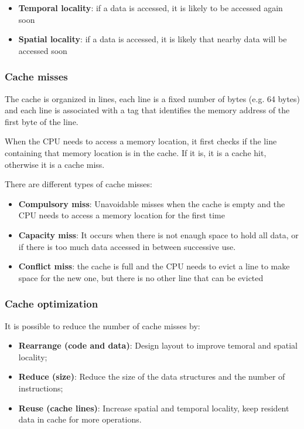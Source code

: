 \begin{itemize}
    \item \textbf{Temporal locality}: if a data is accessed, it is likely to be accessed again soon
    \item \textbf{Spatial locality}: if a data is accessed, it is likely that nearby data will be accessed soon
\end{itemize}

\subsubsection{Cache misses}

The cache is organized in lines, each line is a fixed number of bytes (e.g. 64 bytes) and each line is associated with a tag that identifies the memory address of the first byte of the line.

When the CPU needs to access a memory location, it first checks if the line containing that memory location is in the cache. If it is, it is a cache hit, otherwise it is a cache miss.

There are different types of cache misses:

\begin{itemize}
    \item \textbf{Compulsory miss}: Unavoidable misses when the cache is empty and the CPU needs to access a memory location for the first time
    \item \textbf{Capacity miss}: It occurs when there is not enaugh space to hold all data, or if there is too much data accessed in between successive use.
    \item \textbf{Conflict miss}: the cache is full and the CPU needs to evict a line to make space for the new one, but there is no other line that can be evicted
\end{itemize}

\subsubsection{Cache optimization}

It is possible to reduce the number of cache misses by:

\begin{itemize}
    \item \textbf{Rearrange (code and data)}: Design layout to improve temoral and spatial locality;
    \item \textbf{Reduce (size)}: Reduce the size of the data structures and the number of instructions;
    \item \textbf{Reuse (cache lines)}: Increase spatial and temporal locality, keep resident data in cache for more operations.
\end{itemize}
